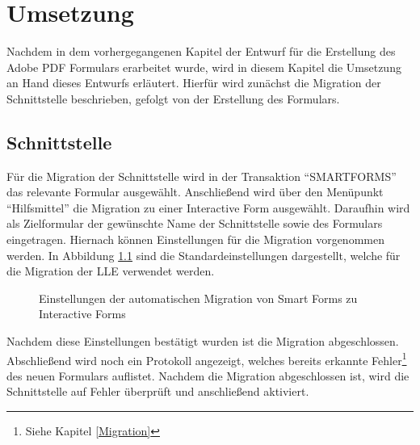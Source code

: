 \chapter{Umsetzung}


Nachdem in dem vorhergegangenen Kapitel der Entwurf für die Erstellung des Adobe PDF Formulars erarbeitet wurde, wird in diesem Kapitel die Umsetzung an Hand dieses Entwurfs erläutert.
Hierfür wird zunächst die Migration der Schnittstelle beschrieben, gefolgt von der Erstellung des Formulars. 
 

\section{Schnittstelle}

Für die Migration der Schnittstelle wird in der Transaktion "`SMARTFORMS"' das relevante Formular ausgewählt. Anschließend wird über den Menüpunkt "`Hilfsmittel"' die Migration zu einer Interactive Form ausgewählt. Daraufhin wird als Zielformular der gewünschte Name der Schnittstelle sowie des Formulars eingetragen. Hiernach können Einstellungen für die Migration vorgenommen werden. In Abbildung \ref{mig-einst}
 sind die Standardeinstellungen dargestellt, welche für die Migration der \ac{LLE} verwendet werden.
 
 \begin{figure}[ht]
 	\centering
 	\caption{Einstellungen der automatischen Migration von Smart Forms zu Interactive Forms}
 	\label{mig-einst}
 \end{figure}

Nachdem diese Einstellungen bestätigt wurden ist die Migration abgeschlossen. Abschließend wird noch ein Protokoll angezeigt, welches bereits erkannte Fehler\footnote{Siehe Kapitel \ref{Migration}} des neuen Formulars auflistet. Nachdem die Migration abgeschlossen ist, wird die Schnittstelle auf Fehler überprüft und anschließend aktiviert. 

